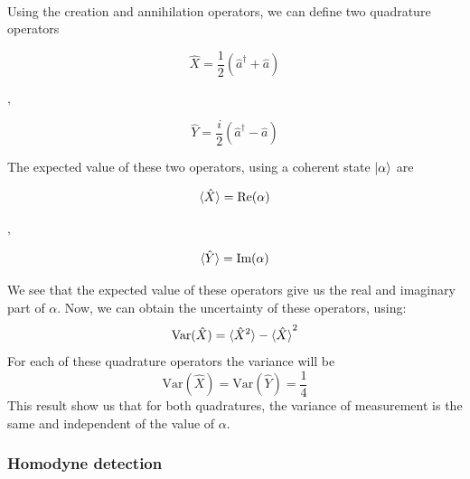 \\
%
%
Using the creation and annihilation operators, we can define two quadrature operators
\cite{loudon2000}
%
\begin{center}
	\begin{minipage}{41mm}
		\noindent
		\begin{equation}
			\hat{X} = \frac{1}{2} \left( \hat{a}^\dagger + \hat{a} \right)
		\end{equation}
	\end{minipage}
	$,\quad$
	\begin{minipage}{40mm}
		\noindent
		\begin{equation}
			\hat{Y} = \frac{i}{2} \left( \hat{a}^\dagger - \hat{a} \right)
		\end{equation}
	\end{minipage}
\end{center}
%
The expected value of these two operators, using a coherent state $\ket{\alpha}$ are
%
\begin{center}
	\begin{minipage}{37mm}
		\noindent
		\begin{equation}
			\braket{\hat{X}} = \textrm{Re}(\alpha)
		\end{equation}
	\end{minipage}
	$,\quad$
	\begin{minipage}{37mm}
		\noindent
		\begin{equation}
			\braket{\hat{Y}} = \textrm{Im}(\alpha)
		\end{equation}
	\end{minipage}
\end{center}
%
We see that the expected value of these operators give us the real and imaginary part of $\alpha$. Now, we can obtain the uncertainty of these operators, using:
%
\begin{equation}
\textrm{Var}(\hat{X}) = \braket{\hat{X}^2} - \braket{\hat{X}}^2
\end{equation}
%
For each of these quadrature operators the variance will be
%
\begin{equation}
\textrm{Var}(\hat{X}) = \textrm{Var}(\hat{Y}) = \frac{1}{4}
\end{equation}
%
This result show us that for both quadratures, the variance of measurement is the same and independent of the value of $\alpha$.
%
%
%
\subsubsection{Homodyne detection}

